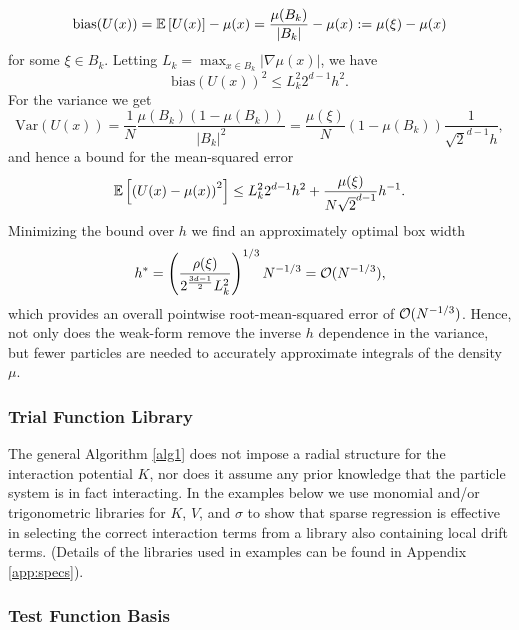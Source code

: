 \documentclass[english,reqno]{amsart}
\begin{document}
\[\text{bias}(U(x))=\mathbb{E}\left[U(x)\right] - \mu(x) = \frac{\mu(B_k)}{|B_k|} -\mu(x) := \mu(\xi)-\mu(x)\]
for some $\xi\in B_k$. Letting $L_k = \max_{x\in B_k}|\nabla \mu(x)|$, we have
\[\text{bias}(U(x))^2 \leq L_k^2 2^{d-1}h^2.\]
For the variance we get
\[\text{Var}\left(U(x)\right) = \frac{1}{N}\frac{\mu(B_k)(1-\mu(B_k))}{|B_k|^2} = \frac{\mu(\xi)}{N}\left(1-\mu(B_k)\right)\frac{1}{\sqrt{2}^{d-1}h},\] 
and hence a bound for the mean-squared error
\[\mathbb{E}\left[\left(U(x)-\mu(x)\right)^2\right]\leq L_k^2 2^{d-1}h^2+ \frac{\mu(\xi)}{N\sqrt{2}^{d-1}}h^{-1}.\]
Minimizing the bound over $h$ we find an approximately optimal box width 
\[h^* = \left(\frac{\rho(\xi)}{2^{\frac{3d-1}{2}}L_k^2}\right)^{1/3}N^{-1/3} = {\mathcal{O}}(N^{-1/3}),\]
which provides an overall pointwise root-mean-squared error of ${\mathcal{O}}(N^{-1/3})$. Hence, not only does the weak-form remove the inverse $h$ dependence in the variance, but fewer particles are needed to accurately approximate integrals of the density $\mu$.


\subsubsection{Trial Function Library}\label{subsec:lib}

The general Algorithm \ref{alg1} does not impose a radial structure for the interaction potential $K$, nor does it assume any prior knowledge that the particle system is in fact interacting. In the examples below we use monomial and/or trigonometric libraries for $K$, $V$, and $\sigma$ to show that sparse regression is effective in selecting the correct interaction terms from a library also containing local drift terms. (Details of the libraries used in examples can be found in Appendix \ref{app:specs}).

\subsubsection{Test Function Basis}
\end{document}
